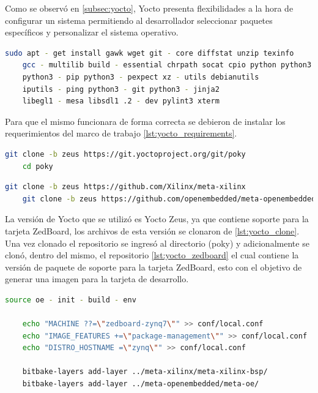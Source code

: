 Como se observó en \ref{subsec:yocto}, Yocto presenta flexibilidades a la hora de configurar un sistema permitiendo al desarrollador seleccionar paquetes específicos y personalizar el sistema operativo.

\begin{lstlisting}[language=bash, caption={Requerimientos Yocto Zeus, Linux}, label=lst:yocto_requirements]
    sudo apt - get install gawk wget git - core diffstat unzip texinfo
    gcc - multilib build - essential chrpath socat cpio python python3
    python3 - pip python3 - pexpect xz - utils debianutils 
    iputils - ping python3 - git python3 - jinja2 
    libegl1 - mesa libsdl1 .2 - dev pylint3 xterm
\end{lstlisting}

Para que el mismo funcionara de forma correcta se debieron de instalar los requerimientos del marco de trabajo \ref{lst:yocto_requirements}.

\begin{lstlisting}[language=bash, caption={Version de Yocto}, label=lst:yocto_clone]
    git clone -b zeus https://git.yoctoproject.org/git/poky
    cd poky
\end{lstlisting}

\begin{lstlisting}[language=bash, caption={BSP para Zedboard}, label=lst:yocto_zedboard]
    git clone -b zeus https://github.com/Xilinx/meta-xilinx
    git clone -b zeus https://github.com/openembedded/meta-openembedded.git
\end{lstlisting}

La versión de Yocto que se utilizó es Yocto Zeus, ya que contiene soporte para la tarjeta ZedBoard, los archivos de esta versión se clonaron de \ref{lst:yocto_clone}. Una vez clonado el repositorio se ingresó al directorio (poky) y adicionalmente se clonó, dentro del mismo, el repositorio \ref{lst:yocto_zedboard} el cual contiene la versión de paquete de soporte para la tarjeta ZedBoard, esto con el objetivo de generar una imagen para la tarjeta de desarrollo.

\begin{lstlisting}[language=bash, caption={Configuraciones adicionales, Yocto}, label=lst:aditional_config]
    source oe - init - build - env
    
    echo "MACHINE ??=\"zedboard-zynq7\"" >> conf/local.conf
    echo "IMAGE_FEATURES +=\"package-management\"" >> conf/local.conf
    echo "DISTRO_HOSTNAME =\"zynq\"" >> conf/local.conf
    
    bitbake-layers add-layer ../meta-xilinx/meta-xilinx-bsp/
    bitbake-layers add-layer ../meta-openembedded/meta-oe/
\end{lstlisting}

